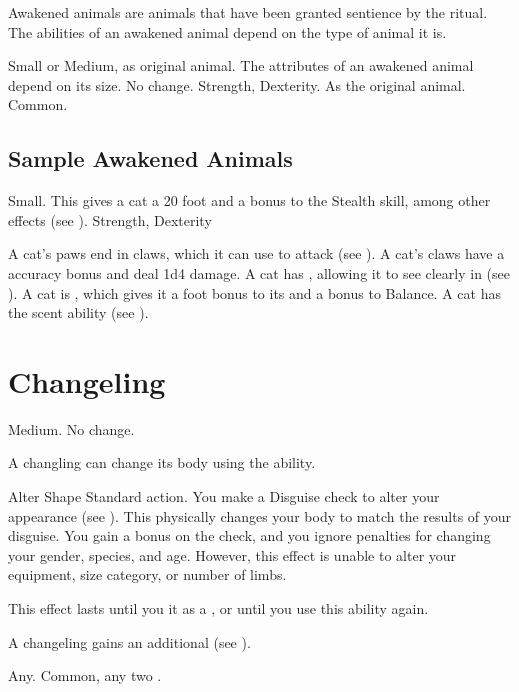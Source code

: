   Awakened animals are animals that have been granted sentience by the  ritual.
  The abilities of an awakened animal depend on the type of animal it is.

   Small or Medium, as original animal.
   The attributes of an awakened animal depend on its size.
   No change.
    Strength,  Dexterity.
   As the original animal.
   Common.

  \subsection{Sample Awakened Animals}


     Small. This gives a cat a 20 foot  and a  bonus to the Stealth skill, among other effects (see ).
      Strength,  Dexterity
    \begin{itemize}
       A cat's paws end in claws, which it can use to attack (see ). A cat's claws have a  accuracy bonus and deal 1d4 damage.
       A cat has , allowing it to see clearly in  (see ).
       A cat is , which gives it a  foot bonus to its  and a  bonus to Balance.
       A cat has the scent ability (see ).
    \end{itemize}

\section{Changeling}

   Medium.
   No change.
  \begin{itemize}
     A changling can change its body using the  ability.
    \begin{activeability}{Alter Shape}
      \abilityusagetime Standard action.
      \rankline
      You make a Disguise check to alter your appearance (see ).
      This physically changes your body to match the results of your disguise.
      You gain a  bonus on the check, and you ignore penalties for changing your gender, species, and age.
      However, this effect is unable to alter your equipment, size category, or number of limbs.

      This effect lasts until you  it as a , or until you use this ability again.
    \end{activeability}
     A changeling gains an additional  (see ).
  \end{itemize}
   Any.
   Common, any two .

